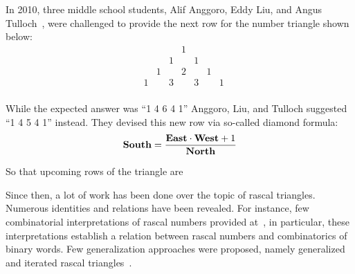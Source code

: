 In 2010, three middle school students, Alif Anggoro, Eddy Liu, and Angus Tulloch~\cite{anggoro2010rascal},
were challenged to provide the next row for the number triangle shown below:
\[
    \begin{array}{cccccccc}
        &   &   &   & 1 &   &   &   \\
        &   &   & 1 &   & 1 &   &   \\
        &   & 1 &   & 2 &   & 1 &   \\
        & 1 &   & 3 &   & 3 &   & 1 \\
    \end{array}
\]

While the expected answer was ``1 4 6 4 1'' Anggoro, Liu, and Tulloch suggested ``1 4 5 4 1'' instead.
They devised this new row via so-called diamond formula:
\begin{align*}
    \mathbf{South}  = \frac{\mathbf{East} \cdot \mathbf{West} + 1}{\mathbf{North}}
\end{align*}

So that upcoming rows of the triangle are


Since then, a lot of work has been done over the topic of rascal triangles.
Numerous identities and relations have been revealed.
For instance, few combinatorial interpretations of rascal numbers provided at~\cite{gibbs2024two}, in particular,
these interpretations establish a relation between rascal numbers and combinatorics of binary words.
Few generalization approaches were proposed, namely generalized
and iterated rascal triangles~\cite{hotchkiss2019generalized,gregory2023iterated}.
